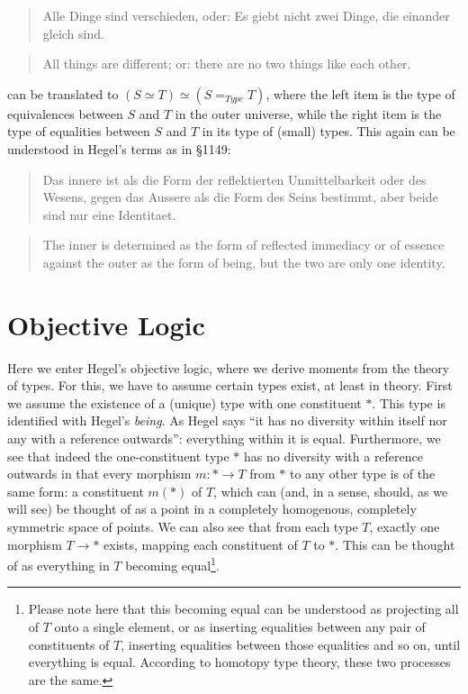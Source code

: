 \documentclass{article}
\begin{document}
\begin{quote}
   Alle Dinge sind verschieden, oder: Es giebt nicht zwei Dinge, die einander gleich sind.
\end{quote}

\begin{quote}
    All things are different; or: there are no two things like each other.
\end{quote}

can be translated to $(S\simeq T)\simeq (S =_{Type} T)$, where the left item is the type of equivalences between $S$ and $T$ in the outer universe, while the right item is the type of equalities between $S$ and $T$ in its type of (small) types. This again can be understood in Hegel's terms as in §1149:

\begin{quote}
    Das innere ist als die Form der reflektierten Unmittelbarkeit oder des Wesens, gegen das Aussere als die Form des Seins bestimmt, aber beide sind nur eine Identitaet.
\end{quote}

\begin{quote}
    The inner is determined as the form of reflected immediacy or of essence against the outer as the form of being, but the two are only one identity.
\end{quote}




\section{Objective Logic}

Here we enter Hegel's objective logic, where we derive moments from the theory of types. For this, we have to assume certain types exist, at least in theory. First we assume the existence of a (unique) type with one constituent $*$. This type is identified with Hegel's \emph{being}. As Hegel says ``it has no diversity within itself nor any with a reference outwards'': everything within it is equal. Furthermore, we see that indeed the one-constituent type $*$ has no diversity with a reference outwards in that every morphism $m:*\rightarrow T$ from $*$ to any other type is of the same form: a constituent $m(*)$ of $T$, which can (and, in a sense, should, as we will see) be thought of as a point in a completely homogenous, completely symmetric space of points. We can also see that from each type $T$, exactly one morphism $T\rightarrow *$ exists, mapping each constituent of $T$ to $*$. This can be thought of as everything in $T$ becoming equal\footnote{Please note here that this becoming equal can be understood as projecting all of $T$ onto a single element, or as inserting equalities between any pair of constituents of $T$, inserting equalities between those equalities and so on, until everything is equal. According to homotopy type theory, these two processes are the same.}. \\ 
\end{document}
